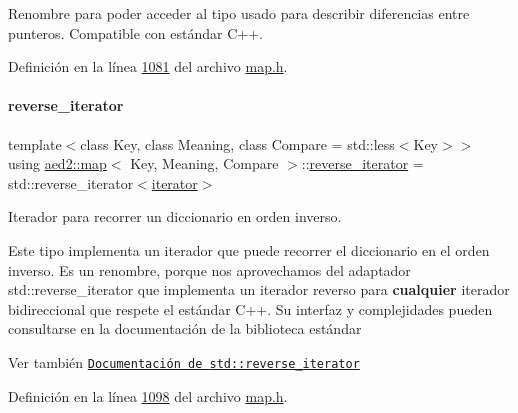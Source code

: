 Renombre para poder acceder al tipo usado para describir diferencias entre punteros. Compatible con estándar C++. 



Definición en la línea \hyperlink{map_8h_source_l01081}{1081} del archivo \hyperlink{map_8h_source}{map.\+h}.

\mbox{\label{classaed2_1_1map_a8e6a592062260177fd73b2f9897b1dd5_a8e6a592062260177fd73b2f9897b1dd5}} 
\paragraph{\texorpdfstring{reverse\+\_\+iterator}{reverse\_iterator}}
{\footnotesize\ttfamily template$<$class Key, class Meaning, class Compare = std\+::less$<$\+Key$>$$>$ \\
using \hyperlink{classaed2_1_1map}{aed2\+::map}$<$ Key, Meaning, Compare $>$\+::\hyperlink{classaed2_1_1map_a8e6a592062260177fd73b2f9897b1dd5_a8e6a592062260177fd73b2f9897b1dd5}{reverse\+\_\+iterator} =  std\+::reverse\+\_\+iterator$<$\hyperlink{classaed2_1_1map_1_1iterator}{iterator}$>$}



Iterador para recorrer un diccionario en orden inverso. 

Este tipo implementa un iterador que puede recorrer el diccionario en el orden inverso. Es un renombre, porque nos aprovechamos del adaptador {\ttfamily std\+::reverse\+\_\+iterator} que implementa un iterador reverso para {\bfseries cualquier} iterador bidireccional que respete el estándar C++. Su interfaz y complejidades pueden consultarse en la documentación de la biblioteca estándar

\begin{DoxySeeAlso}{Ver también}
\href{http://en.cppreference.com/w/cpp/iterator/reverse_iterator}{\tt Documentación de {\ttfamily std\+::reverse\+\_\+iterator}} 
\end{DoxySeeAlso}


Definición en la línea \hyperlink{map_8h_source_l01098}{1098} del archivo \hyperlink{map_8h_source}{map.\+h}.

\mbox{\label{classaed2_1_1map_aed66a216549d13078a3ea6978ea0b768_aed66a216549d13078a3ea6978ea0b768}} 
